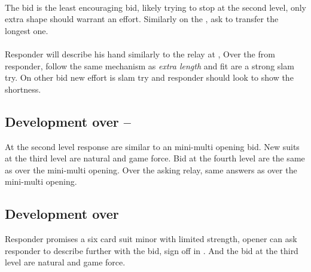 \paragraph{}
The \bid{2\CS} bid is the least encouraging bid, likely trying to stop at the second level, only extra shape should warrant an effort.
Similarly on the \bid{3\NT}, \bid{4\CS} ask to transfer the longest one.
\paragraph{}
Responder will describe his hand similarly to the relay at \bid{2\CS},
Over the \bid{2\HS/\SpS} from responder, \bid{2\NT} follow the same mechanism as \emph{extra length} and fit are a strong slam try. On other bid new effort is slam try and responder should look to show the shortness.
\subsection{Development over \bid{1\CS}–\bid{2\DS}}
At the second level response are similar to an \bid{2\DS} mini-multi opening bid. New suits at the third level are natural and game force. Bid at the fourth level are the same as over the mini-multi opening. Over the \bid{2\NT} asking relay, same answers as over the mini-multi opening.
\subsection{Development over }
Responder promises a six card suit minor with limited strength, opener can ask responder to describe further with the \bid{2\SpS} bid, sign off in . And the bid at the third level are natural and game force.
